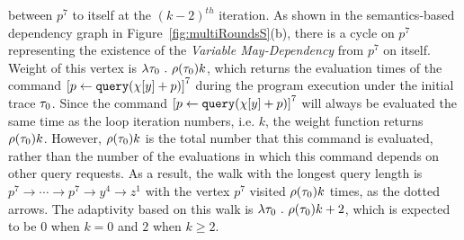 \begin{example}
    between $p^7$ to itself at the $(k - 2)^{th}$ iteration.
    As shown in the semantics-based dependency graph in Figure~\ref{fig:multiRoundsS}(b), 
    there is a cycle on $p^7$ representing the existence of the \emph{Variable May-Dependency} from $p^7$ on itself.
    Weight of this vertex is $\lambda \mathtt{\tau}_0 ~.~ \rho(\mathtt{\tau}_0) k$,
    which returns the evaluation times of the command $\clabel{\assign{p}{\query(\chi[y]+p)} }^{7}$ during the program execution under the initial trace $\mathtt{\tau}_0$.
    Since the command $\clabel{\assign{p}{\query(\chi[y]+p)} }^{7}$  will always be evaluated the same time as the loop iteration numbers, i.e. $k$,
    the weight function returns $\rho(\mathtt{\tau}_0) k$.
    However, $\rho(\mathtt{\tau}_0) k$ is the total number that this command is evaluated, rather than the number of the evaluations in which this command depends on other query requests.
    As a result, the walk with the longest query length 
    is
    $p^7 \to \cdots \to p^7 \to y^4 \to z^1 $ with the vertex $p^7$ visited $\rho(\mathtt{\tau}_0) k$ times, as the dotted arrows. 
    The adaptivity based on this walk
    is $\lambda \mathtt{\tau}_0 ~.~ \rho(\mathtt{\tau}_0) k + 2$,
    which is expected to be $0$ when $k = 0$ and $2$ when $k \geq 2$.
    {
    \begin{figure}
    \centering
    \quad
    \begin{subfigure}{.8\textwidth}
\end{subfigure}
\end{figure}}
\end{example}

